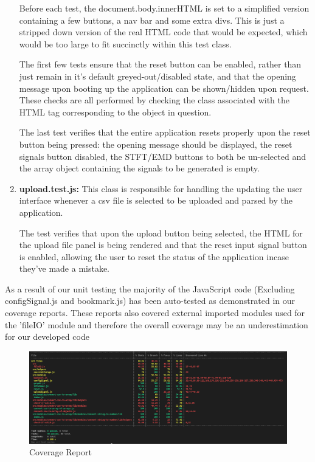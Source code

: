 \begin{enumerate}
    Before each test, the document.body.innerHTML is set to a simplified version containing a few buttons, a nav bar and some extra divs. This is just a stripped down version of the real HTML code that would be expected, which would be too large to fit succinctly within this test class.
    
    The first few tests ensure that the reset button can be enabled, rather than just remain in it's default greyed-out/disabled state, and that the opening message upon booting up the application can be shown/hidden upon request. These checks are all performed by checking the class associated with the HTML tag corresponding to the object in question.
    
    The last test verifies that the entire application resets properly upon the reset button being pressed: the opening message should be displayed, the reset signals button disabled, the STFT/EMD buttons to both be un-selected and the array object containing the signals to be generated is empty. 
    
    \item {\bf upload.test.js:} This class is responsible for handling the updating the user interface whenever a csv file is selected to be uploaded and parsed by the application. 
    
    The test verifies that upon the upload button being selected, the HTML for the upload file panel is being rendered and that the reset input signal button is enabled, allowing the user to reset the status of the application incase they've made a mistake.
\end{enumerate}

As a result of our unit testing the majority of the JavaScript code (Excluding configSignal.js and bookmark.js) has been auto-tested as demonstrated in our coverage reports. These reports also covered external imported modules used for the 'fileIO' module and therefore the overall coverage may be an underestimation for our developed code

\begin{figure}[H]
    \centering
    \includegraphics[width=1.0\textwidth]{figures/coveragereports.png}
    \caption{\label{fig:Coverage Report}Coverage Report}
\end{figure}


